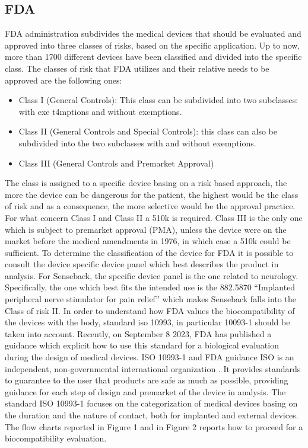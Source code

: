 \documentclass{Configuration_Files/PoliMi3i_thesis}
\begin{document}
\subsection{FDA}

FDA administration subdivides the medical devices that should be evaluated and approved into three classes of risks, based on the specific application. Up to now, more than 1700 different devices have been classified and divided into the specific class. \cite{healthClassifyYourMedical2023}
The classes of risk that FDA utilizes and their relative needs to be approved are the following ones: 
\begin{itemize}

	\item  Class I (General Controls): This class can be subdivided into two subclasses: with exe        t4mptions and without exemptions.
	\item  Class II (General Controls and Special Controls): this class can also be subdivided into the two subclasses with and without exemptions.
	\item  Class III (General Controls and Premarket Approval)

\end{itemize}

The class is assigned to a specific device basing on a risk based approach, the more the device can be dangerous for the patient, the highest would be the class of risk and as a consequence, the more selective would be the approval practice. For what concern Class I and Class II a 510k is required. Class III is the only one which is subject to premarket approval (PMA), unless the device were on the market before the medical amendments in 1976, in which case a 510k could be sufficient.
To determine the classification of the device for FDA it is possible to consult the device specific device panel \cite{healthDeviceClassificationPanels2023} which best describes the product in analysis. For Senseback, the specific device panel is the one related to neurology. Specifically, the one which best fits the intended use is the 882.5870 “Implanted peripheral nerve stimulator for pain relief” \cite{CFRCodeFederal} which makes Senseback falls into the Class of risk II.
In order to understand how FDA values the biocompatibility of the devices with the body, standard iso 10993, in particular 10093-1 \cite{14:00-17:00ISO1099312018a} should be taken into account. Recently, on September 8 2023, FDA has published a guidance \cite{healthUseInternationalStandard2023} which explicit how to use this standard for a biological evaluation during the design of medical devices. 
ISO 10993-1 and FDA guidance
ISO is an independent, non-governmental international organization \cite{ISOInternationalOrganization}. It provides standards to guarantee to the user that products are safe as much as possible, providing guidance for each step of design and premarket of the device in analysis.
The standard ISO 10993-1 focuses on the categorization of medical devices basing on the duration and the nature of contact, both for implanted and external devices.
The flow charts reported in Figure 1 and in Figure 2 reports how to proceed for a biocompatibility evaluation.
\end{document}
